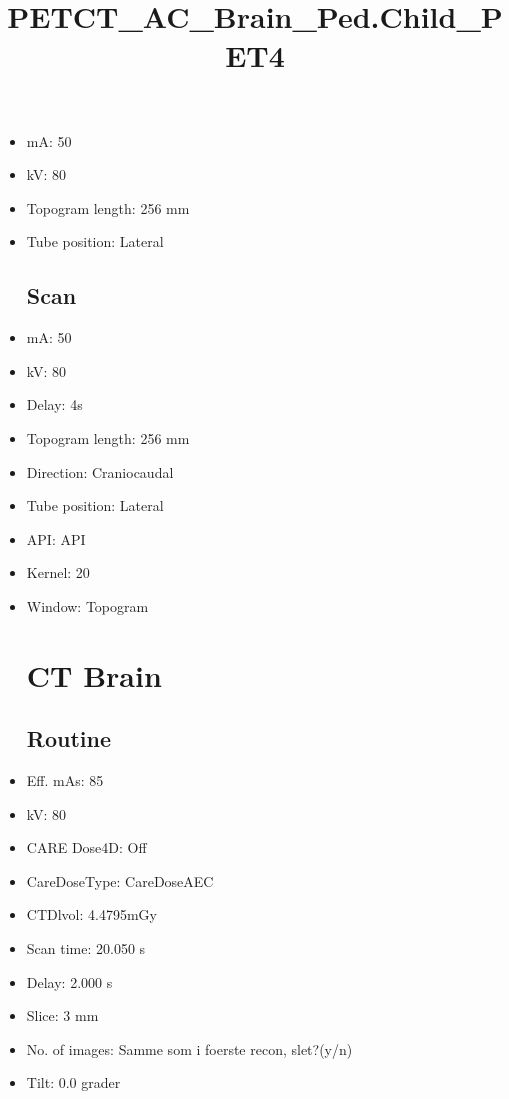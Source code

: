 \documentclass[12pt]{article}
\title{PETCT\_AC\_Brain\_Ped.Child\_PET4}
\begin{document}
\maketitle
\newpage
\tableofcontents
\newpage
{}


\begin{itemize}\section{Topogram}
\subsection{Routine}
\item mA: 50\item kV: 80\item Topogram length: 256 mm\item Tube position: Lateral
\subsection{Scan}\item mA: 50\item kV: 80\item Delay: 4s\item Topogram length: 256 mm\item Direction: Craniocaudal\item Tube position: Lateral\item API: API \item Kernel: 20\item Window: Topogram
\section{CT Brain}
\subsection{Routine}
\item Eff. mAs: 85\item kV: 80\item CARE Dose4D: Off\item CareDoseType: CareDoseAEC\item CTDlvol: 4.4795mGy\item Scan time: 20.050 s\item Delay: 2.000 s\item Slice: 3 mm\item No. of images: Samme som i foerste recon, slet?(y/n)\item Tilt: 0.0 grader

\end{itemize}
\end{document}

